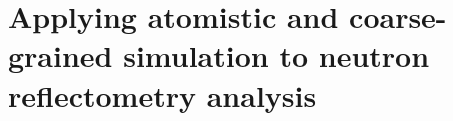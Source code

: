 
\chapter{Applying atomistic and coarse-grained simulation to neutron reflectometry analysis} %

\label{reflectometry2} %


%
%
%
%
